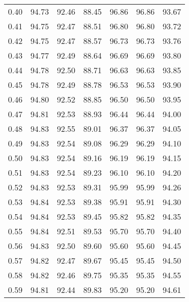 \begin{tabular}{|c|c|c|c|c|c|c|}
      0.40 &     94.73 &     92.46 &      88.45 &   96.86 &      96.86 &         93.67 \\
      0.41 &     94.75 &     92.47 &      88.51 &   96.80 &      96.80 &         93.72 \\
      0.42 &     94.75 &     92.47 &      88.57 &   96.73 &      96.73 &         93.76 \\
      0.43 &     94.77 &     92.49 &      88.64 &   96.69 &      96.69 &         93.80 \\
      0.44 &     94.78 &     92.50 &      88.71 &   96.63 &      96.63 &         93.85 \\
      0.45 &     94.78 &     92.49 &      88.78 &   96.53 &      96.53 &         93.90 \\
      0.46 &     94.80 &     92.52 &      88.85 &   96.50 &      96.50 &         93.95 \\
      0.47 &     94.81 &     92.53 &      88.93 &   96.44 &      96.44 &         94.00 \\
      0.48 &     94.83 &     92.55 &      89.01 &   96.37 &      96.37 &         94.05 \\
      0.49 &     94.83 &     92.54 &      89.08 &   96.29 &      96.29 &         94.10 \\
      0.50 &     94.83 &     92.54 &      89.16 &   96.19 &      96.19 &         94.15 \\
      0.51 &     94.83 &     92.54 &      89.23 &   96.10 &      96.10 &         94.20 \\
      0.52 &     94.83 &     92.53 &      89.31 &   95.99 &      95.99 &         94.26 \\
      0.53 &     94.84 &     92.53 &      89.38 &   95.91 &      95.91 &         94.30 \\
      0.54 &     94.84 &     92.53 &      89.45 &   95.82 &      95.82 &         94.35 \\
      0.55 &     94.84 &     92.51 &      89.53 &   95.70 &      95.70 &         94.40 \\
      0.56 &     94.83 &     92.50 &      89.60 &   95.60 &      95.60 &         94.45 \\
      0.57 &     94.82 &     92.47 &      89.67 &   95.45 &      95.45 &         94.50 \\
      0.58 &     94.82 &     92.46 &      89.75 &   95.35 &      95.35 &         94.55 \\
      0.59 &     94.81 &     92.44 &      89.83 &   95.20 &      95.20 &         94.61 \\

\end{tabular}
